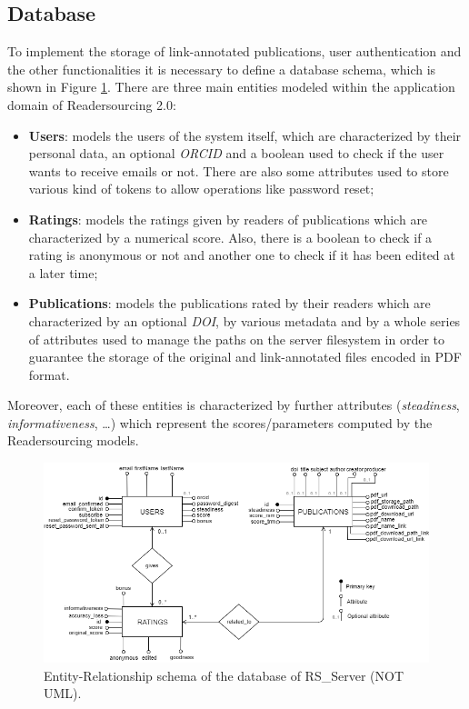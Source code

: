 \documentclass[a4paper, english]{article}
\begin{document}
\subsection{Database}

To implement the storage of link-annotated publications, user authentication and the other functionalities it is necessary to define a database schema, which is shown in Figure \ref{fig:er}. There are three main entities modeled within the application domain of Readersourcing 2.0:

\begin{itemize}
\item \textbf{Users}: models the users of the system itself, which are characterized by their personal data, an optional \emph{ORCID} and a boolean used to check if the user wants to receive emails or not. There are also some attributes used to store various kind of tokens to allow operations like password reset;
\item \textbf{Ratings}: models the ratings given by readers of publications which are characterized by a numerical score. Also, there is a boolean to check if a rating is anonymous or not and another one to check if it has been edited at a later time;
\item \textbf{Publications}: models the publications rated by their readers which are characterized by an optional \emph{DOI}, by various metadata and by a whole series of attributes used to manage the paths on the server filesystem in order to guarantee the storage of the original and link-annotated files encoded in PDF format. 
\end{itemize}
Moreover, each of these entities is characterized by further attributes (\emph{steadiness}, \emph{informativeness}, \dots) which represent the scores/parameters computed by the Readersourcing models.

\begin{figure}[!tbp]
\centering
\includegraphics[width=\textwidth]{figures/er.png}
\caption{Entity-Relationship schema of the database of RS\_Server (NOT UML).}
\label{fig:er}
\end{figure}
\end{document}
